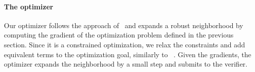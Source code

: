     \paragraph{The optimizer}
    Our optimizer follows the approach of~\cite{MARVEL} and expands a robust neighborhood by computing the gradient of the optimization problem defined in the previous section.
    Since it is a constrained optimization, we relax the constraints and add equivalent terms to the optimization goal, similarly to ~\cite{MARVEL}.
    Given the gradients, the optimizer expands the neighborhood by a small step and submits to the verifier. 
    
